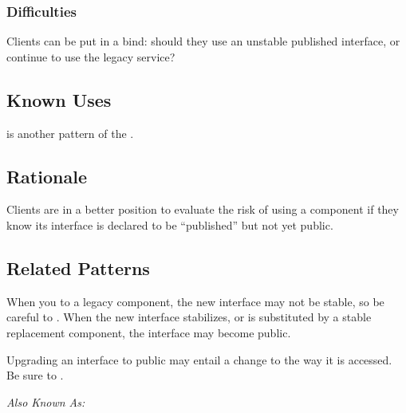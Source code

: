 \documentclass[a4paper,10pt,twoside]{book}
\begin{document}
\subsubsection*{Difficulties}

\begin{bulletlist}
\item Clients can be put in a bind: should they use an unstable published interface, or continue to use the legacy service?
\end{bulletlist}

\subsection*{Known Uses}

 is another pattern of the  \cite{Ocal00a}.

\subsection*{Rationale}

Clients are in a better position to evaluate the risk of using a component if they know its interface is declared to be ``published'' but not yet public.

\subsection*{Related Patterns}

When you  to a legacy component, the new interface may not be stable, so be careful to . When the new interface stabilizes, or is substituted by a stable replacement component, the interface may become public.

Upgrading an interface to public may entail a change to the way it is accessed. Be sure to .


\emph{Also Known As:}   \cite{Stev98a}

\end{document}
